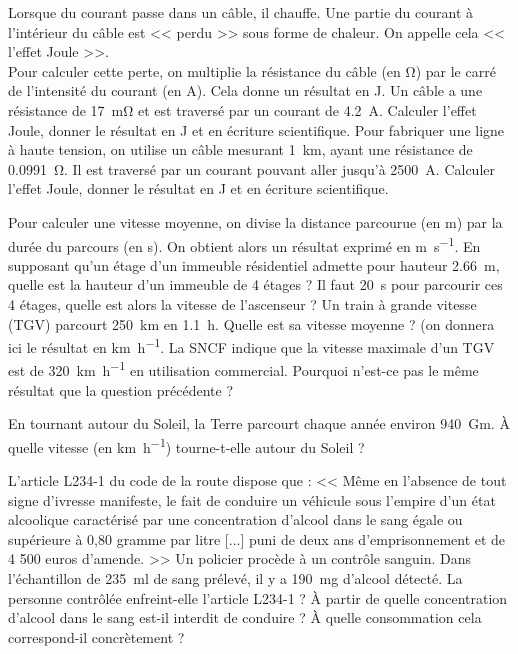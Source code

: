 \documentclass[../Cours.tex]{subfiles}
\begin{document}
\begin{questions}
        \vspace{1em}
        \question Lorsque du courant passe dans un câble, il chauffe. Une partie du courant à l'intérieur du câble est << perdu >> sous forme de chaleur. On appelle cela << l'effet Joule >>. \\
        Pour calculer cette perte, on multiplie la résistance du câble (en \unit{\ohm}) par le carré de l'intensité du courant (en \unit{A}). Cela donne un résultat en \unit{\joule}.
            \subquestion Un câble a une résistance de \qty{17}{\milli\ohm} et est traversé par un courant de \qty{4.2}{\ampere}. Calculer l'effet Joule, donner le résultat en \unit{\joule} et en écriture scientifique.
            \subquestion Pour fabriquer une ligne à haute tension, on utilise un câble mesurant \qty{1}{\kilo\metre}, ayant une résistance de \qty{0,0991}{\ohm}. Il est traversé par un courant pouvant aller jusqu'à \qty{2500}{\ampere}. Calculer l'effet Joule, donner le résultat en \unit{\joule} et en écriture scientifique.
            

        \question Pour calculer une vitesse moyenne, on divise la distance parcourue (en \unit{\metre}) par la durée du parcours (en \unit{\second}). On obtient alors un résultat exprimé en \unit{\metre\per\second}.
            \subquestion En supposant qu'un étage d'un immeuble résidentiel admette pour hauteur \qty{2.66}{\metre}, quelle est la hauteur d'un immeuble de 4 étages ?
            \subquestion Il faut \qty{20}{\second} pour parcourir ces 4 étages, quelle est alors la vitesse de l'ascenseur ?
            \subquestion Un train à grande vitesse (TGV) parcourt \qty{250}{\kilo\metre} en \qty{1.1}{\hour}. Quelle est sa vitesse moyenne ? (on donnera ici le résultat en \unit{\kilo\metre\per\hour}.
            \subquestion La SNCF indique que la vitesse maximale d'un TGV est de \qty{320}{\kilo\metre\per\hour} en utilisation commercial. Pourquoi n'est-ce pas le même résultat que la question précédente ?

        \vspace{1em}
        \question En tournant autour du Soleil, la Terre parcourt chaque année environ \qty{940}{\giga\metre}. À quelle vitesse (en \unit{\kilo\metre\per\hour}) tourne-t-elle autour du Soleil ?

        \vspace{1em}
        \question L'article L234-1 du code de la route dispose que : << Même en l'absence de tout signe d'ivresse manifeste, le fait de conduire un véhicule sous l'empire d'un état alcoolique caractérisé par une concentration d'alcool dans le sang égale ou supérieure à 0,80 gramme par litre [...] puni de deux ans d'emprisonnement et de 4 500 euros d'amende. >>
            \subquestion Un policier procède à un contrôle sanguin. Dans l'échantillon de \qty{235}{\milli\litre} de sang prélevé, il y a \qty{190}{\milli\gram} d'alcool détecté. La personne contrôlée enfreint-elle l'article L234-1 ?
            \subquestion À partir de quelle concentration d'alcool dans le sang est-il interdit de conduire ? À quelle consommation cela correspond-il concrètement ?
\end{questions}
\end{document}
